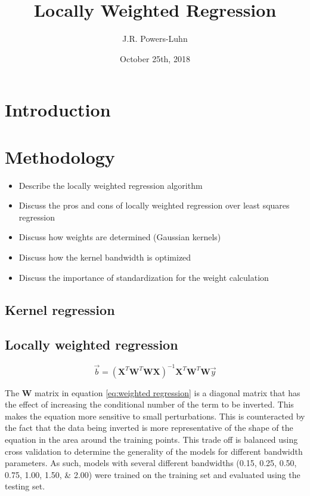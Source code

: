 \documentclass{IEEEtran}
\author{J.R. Powers-Luhn}
\title{Locally Weighted Regression}
\date{October 25th, 2018}
\begin{document}
\maketitle

\begin{abstract}



\end{abstract}

\section{Introduction}



\section{Methodology}

\begin{itemize}
\item Describe the locally weighted regression algorithm
\item Discuss the pros and cons of locally weighted regression over least squares regression
\item Discuss how weights are determined (Gaussian kernels)
\item Discuss how the kernel bandwidth is optimized
\item Discuss the importance of standardization for the weight calculation
\end{itemize}

\subsection{Kernel regression}



\subsection{Locally weighted regression}

\begin{equation}
\vec{b} = (\mathbf{X}^T  \mathbf{W}^T  \mathbf{W}  \mathbf{X})^{-1} \mathbf{X}^T \mathbf{W}^T \mathbf{W} \vec{y}
\label{eq:weighted regression}
\end{equation}

The $\mathbf{W}$ matrix in equation \ref{eq:weighted regression} is a diagonal matrix that has the effect of increasing the 
conditional number of the term to be inverted. This makes the equation more sensitive to small perturbations. This is counteracted 
by the fact that the data being inverted is more representative of the shape of the equation in the area around the training points. 
This trade off is balanced using cross validation to determine the generality of the models for different bandwidth parameters. 
As such, models with several different bandwidths (\numlist{0.15; 0.25; 0.50; 0.75; 1.00; 1.50; 2.00}) were trained on the training 
set and evaluated using the testing set.
\end{document}
